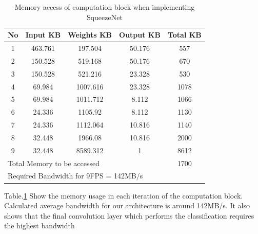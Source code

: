 \documentclass[conference]{IEEEtran}
\begin{document}
\begin{table}[]
\caption{Memory access of computation block when implementing SqueezeNet}
\begin{tabular}{|c|c|c|c|c|}
\hline
No    & Input KB    & Weights KB    & Output KB   & Total KB \\ \hline
1     & 463.761     & 197.504       & 50.176      & 557      \\ \hline
2     & 150.528     & 519.168       & 50.176      & 670      \\ \hline
3     & 150.528     & 521.216       & 23.328      & 530      \\ \hline
4     & 69.984      & 1007.616      & 23.328      & 1078     \\ \hline
5     & 69.984      & 1011.712      & 8.112       & 1066     \\ \hline
6     & 24.336      & 1105.92       & 8.112       & 1130     \\ \hline
7     & 24.336      & 1112.064      & 10.816      & 1140     \\ \hline
8     & 32.448      & 1966.08       & 10.816      & 2000     \\ \hline
9     & 32.448      & 8589.312      & 1           & 8612     \\ \hline
\multicolumn{4}{|l|}{Total Memory to be accessed} & 1700     \\ \hline
\multicolumn{5}{|l|}{Required Bandwidth for 9FPS = 142MB/s}  \\ \hline
\end{tabular}
\label{tab3}
\end{table}


Table.\ref{tab3} Show the memory usage in each iteration of the computation block. Calculated average bandwidth for our architecture is around 142MB/s. It also shows that the final convolution layer which performs the classification requires the highest bandwidth
\end{document}
